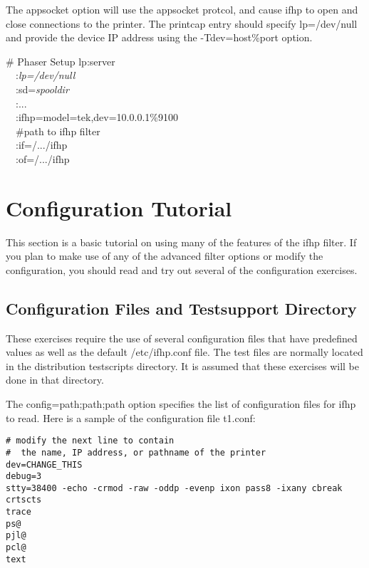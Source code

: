 \documentclass[a4paper]{article}
\begin{document}
The {\ttfamily appsocket} option will use the appsocket protcol,
and cause {\ttfamily ifhp} to open and close connections to the printer.
The printcap entry should specify
{\ttfamily lp=/dev/null}
and provide the device IP address using the {\ttfamily -Tdev=host\%port} option.
\begin{tscreen}
\# Phaser Setup
lp:server  \\ 
~~:{\itshape lp=/dev/null\/}  \\ 
~~:sd={\itshape spooldir\/}  \\ 
~~:...  \\ 
~~:ifhp=model=tek,dev=10.0.0.1\%9100\\ 
~~\#path to ifhp filter  \\ 
~~:if=/.../ifhp  \\ 
~~:of=/.../ifhp  
\end{tscreen}





\section{Configuration Tutorial}

This section is a basic tutorial on using many of the features of
the
{\ttfamily ifhp}
filter.
If you plan to make use of any of the advanced filter options or
modify the configuration,
you should read and try out several of the
configuration exercises.


\subsection{Configuration Files and Testsupport Directory }

These exercises require the use of several configuration files
that have predefined values as well as the
default
{\ttfamily /etc/ifhp.conf} file.
The test files are normally located in the distribution 
{\ttfamily testscripts}
directory.
It is assumed that these exercises will be done in that
directory.

The
{\ttfamily config=path;path;path}
option specifies the list of configuration files for
{\ttfamily ifhp}
to read.
Here is a sample of the configuration file
{\ttfamily t1.conf}:
\begin{tscreen}
\begin{verbatim}
# modify the next line to contain
#  the name, IP address, or pathname of the printer
dev=CHANGE_THIS
debug=3
stty=38400 -echo -crmod -raw -oddp -evenp ixon pass8 -ixany cbreak crtscts
trace
ps@ 
pjl@
pcl@
text
\end{verbatim}
\end{tscreen}
\end{document}
